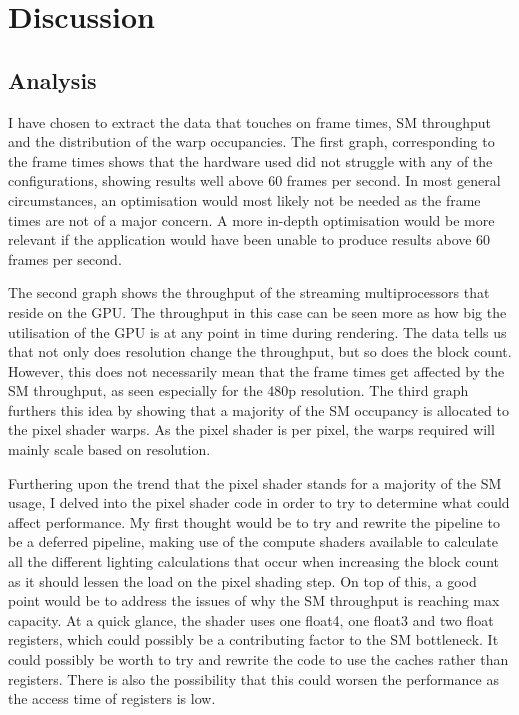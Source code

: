 \documentclass{article}
\begin{document}
\section{Discussion}

\subsection{Analysis}

I have chosen to extract the data that touches on frame times, SM throughput and the distribution of the warp occupancies. The first graph, corresponding to the frame times shows 
that the hardware used did not struggle with any of the configurations, showing results well above 60 frames per second. In most general circumstances, an optimisation would most likely
not be needed as the frame times are not of a major concern. A more in-depth optimisation would be more relevant if the application would have been unable to produce results above 60
frames per second.

The second graph shows the throughput of the streaming multiprocessors that reside on the GPU. The throughput in this case can be seen more as how big the utilisation of the GPU is 
at any point in time during rendering. The data tells us that not only does resolution change the throughput, but so does the block count. However, this does not necessarily mean that
the frame times get affected by the SM throughput, as seen especially for the 480p resolution. The third graph furthers this idea by showing that a majority of the SM occupancy is 
allocated to the pixel shader warps. As the pixel shader is per pixel, the warps required will mainly scale based on resolution.

Furthering upon the trend that the pixel shader stands for a majority of the SM usage, I delved into the pixel shader code in order to try to determine what could affect performance.
My first thought would be to try and rewrite the pipeline to be a deferred pipeline, making use of the compute shaders available to calculate all the different lighting calculations 
that occur when increasing the block count as it should lessen the load on the pixel shading step. On top of this, a good point would be to address the issues of why the SM throughput
is reaching max capacity. At a quick glance, the shader uses one float4, one float3 and two float registers, which could possibly be a contributing factor to the SM bottleneck. It could
possibly be worth to try and rewrite the code to use the caches rather than registers. There is also the possibility that this could worsen the performance as the access time of registers
is low.
\end{document}
